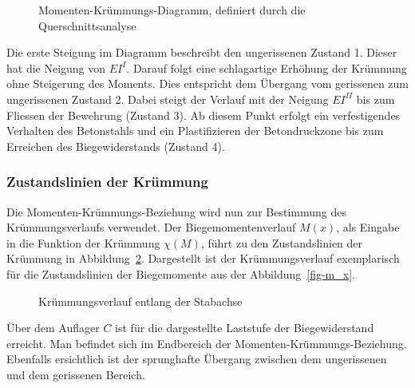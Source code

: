 \documentclass[
  12pt,
  letterpaper,
  egregdoesnotlikesansseriftitles]{scrreprt}
\begin{document}
\begin{figure}[H]


\caption{\label{fig-mchi_diagramm}Momenten-Krümmungs-Diagramm, definiert
durch die Querschnittsanalyse}

\end{figure}%

Die erste Steigung im Diagramm beschreibt den ungerissenen Zustand 1.
Dieser hat die Neigung von \(EI^I\). Darauf folgt eine schlagartige
Erhöhung der Krümmung ohne Steigerung des Moments. Dies entspricht dem
Übergang vom gerissenen zum ungerissenen Zustand 2. Dabei steigt der
Verlauf mit der Neigung \(EI^{II}\) bis zum Fliessen der Bewehrung
(Zustand 3). Ab diesem Punkt erfolgt ein verfestigendes Verhalten des
Betonstahls und ein Plastifizieren der Betondruckzone bis zum Erreichen
des Biegewiderstands (Zustand 4).

\subsubsection{Zustandslinien der
Krümmung}\label{zustandslinien-der-kruxfcmmung}

Die Momenten-Krümmungs-Beziehung wird nun zur Bestimmung des
Krümmungsverlaufs verwendet. Der Biegemomentenverlauf \(M(x)\), als
Eingabe in die Funktion der Krümmung \(\chi(M)\), führt zu den
Zustandslinien der Krümmung in Abbildung~\ref{fig-chi_x_diagramm}.
Dargestellt ist der Krümmungsverlauf exemplarisch für die Zustandslinien
der Biegemomente aus der Abbildung~\ref{fig-m_x}.

\begin{figure}[H]


\caption{\label{fig-chi_x_diagramm}Krümmungsverlauf entlang der
Stabachse}

\end{figure}%

Über dem Auflager \(C\) ist für die dargestellte Laststufe der
Biegewiderstand erreicht. Man befindet sich im Endbereich der
Momenten-Krümmungs-Beziehung. Ebenfalls ersichtlich ist der sprunghafte
Übergang zwischen dem ungerissenen und dem gerissenen Bereich.
\end{document}
